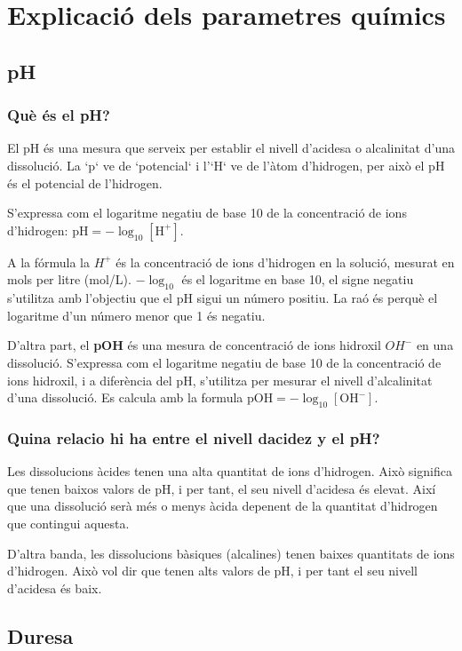 \section{Explicació dels parametres químics}

\subsection{pH} \label{subsec:ph}
\subsubsection{Què és el pH?}
El pH és una mesura que serveix per establir el nivell d’acidesa o alcalinitat d'una dissolució. La `p` ve de `potencial` i l'`H` ve de l’àtom d’hidrogen, per això el pH és el potencial de l’hidrogen.

S'expressa com el logaritme negatiu de base 10 de la concentració de ions d'hidrogen: $ \text{pH} = -\log_{10} [\mathrm{H}^+] $.

A la fórmula la ${H}^+$ és la concentració de ions d'hidrogen en la solució, mesurat en mols per litre (mol/L). $-\log_{10}$ és el logaritme en base 10, el signe negatiu s'utilitza amb l'objectiu que el pH sigui un número positiu. La raó és perquè el logaritme d'un número menor que 1 és negatiu.

D'altra part, el \textbf{pOH} és una mesura de concentració de ions hidroxil ${OH}^-$ en una dissolució. S'expressa com el logaritme negatiu de base 10 de la concentració de ions hidroxil, i a diferència del pH, s'utilitza per mesurar el nivell d’alcalinitat d'una dissolució. Es calcula amb la formula  $ \text{pOH} = -\log_{10} [\mathrm{OH}^-] $.
\subsubsection{Quina relacio hi ha entre el nivell dacidez y el pH?}
Les dissolucions àcides tenen una alta quantitat de ions d'hidrogen. Això significa que tenen baixos valors de pH, i per tant, el seu nivell d'acidesa és elevat. Així que una dissolució serà més o menys àcida depenent de la quantitat d'hidrogen que contingui aquesta.

D'altra banda, les dissolucions bàsiques (alcalines) tenen baixes quantitats de ions d'hidrogen. Això vol dir que tenen alts valors de pH, i per tant el seu nivell d'acidesa és baix.

\subsection{Duresa} \label{subsec:duresa}

